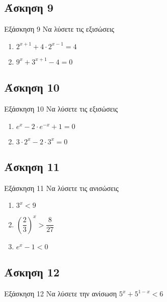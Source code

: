 \documentclass[greek]{beamer}
\begin{document}
\subsection{Άσκηση 9}
\begin{frame}[label=Άσκηση9,t]{Εξάσκηση 9}
 Να λύσετε τις εξισώσεις
 \begin{enumerate}
  \item<1-> $2^{x+1}+4\cdot 2^{x-1}=4$
  \item<2-> $9^x+3^{x+1}-4=0$
 \end{enumerate}

\end{frame}

\subsection{Άσκηση 10}
\begin{frame}[label=Άσκηση10,t]{Εξάσκηση 10}
 Να λύσετε τις εξισώσεις
 \begin{enumerate}
  \item<1-> $e^x-2\cdot e^{-x}+1=0$
  \item<2-> $3\cdot 2^x-2\cdot 3^x=0$
 \end{enumerate}

\end{frame}

\subsection{Άσκηση 11}
\begin{frame}[label=Άσκηση11,t]{Εξάσκηση 11}
 Να λύσετε τις ανισώσεις
 \begin{enumerate}
  \item<1-> $3^x<9$
  \item<2-> $\left( \dfrac{2}{3} \right)^x > \dfrac{8}{27} $
  \item<3-> $e^x-1<0$
 \end{enumerate}

\end{frame}

\subsection{Άσκηση 12}
\begin{frame}[label=Άσκηση12,t]{Εξάσκηση 12}
 Να λύσετε την ανίσωση $5^x+5^{1-x}<6$

\end{frame}
\end{document}
